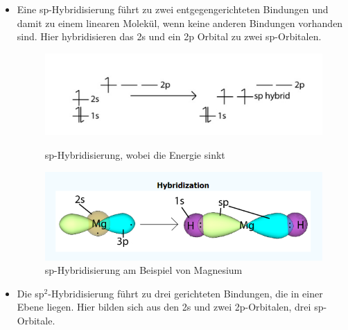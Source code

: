 \begin{itemize}
    \item Eine sp-Hybridisierung führt zu zwei entgegengerichteten Bindungen und damit
          zu einem linearen Molekül, wenn keine anderen Bindungen vorhanden sind. Hier hybridisieren das 2s und ein 2p Orbital zu zwei sp-Orbitalen.
         
          \begin{figure}[H]
            \begin{minipage}[b]{0.5\linewidth} 
               \includegraphics[width=0.8\linewidth]{resources/28-11-2018/sp11.PNG}
               \caption{sp-Hybridisierung, wobei die Energie sinkt}
            \end{minipage}
            \hspace{0.01\linewidth}
            \begin{minipage}[b]{0.5\linewidth} 
               \includegraphics[width=0.8\linewidth]{resources/28-11-2018/sp12.PNG}
               \caption{sp-Hybridisierung am Beispiel von Magnesium }
            \end{minipage}
         \end{figure}

    \item Die sp$^2$-Hybridisierung führt zu drei gerichteten Bindungen, die in einer
          Ebene liegen. Hier bilden sich aus den 2s und zwei 2p-Orbitalen, drei sp-Orbitale.


\end{itemize}
